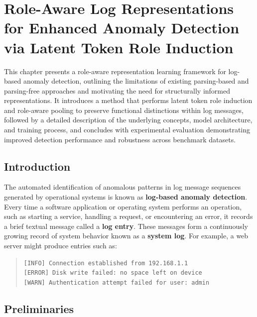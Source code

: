 \chapter{Role-Aware Log Representations for Enhanced Anomaly Detection via Latent Token Role Induction}

This chapter presents a role-aware representation learning framework for log-based anomaly detection, outlining the limitations of existing parsing-based and parsing-free approaches and motivating the need for structurally informed representations. It introduces a method that performs latent token role induction and role-aware pooling to preserve functional distinctions within log messages, followed by a detailed description of the underlying concepts, model architecture, and training process, and concludes with experimental evaluation demonstrating improved detection performance and robustness across benchmark datasets.

\section{Introduction}


The automated identification of anomalous patterns in log message sequences generated by operational systems is known as \textbf{log-based anomaly detection}. Every time a software application or operating system performs an operation, such as starting a service, handling a request, or encountering an error, it records a brief textual message called a \textbf{log entry}. These messages form a continuously growing record of system behavior known as a \textbf{system log}. For example, a web server might produce entries such as:

\begin{quote}
\texttt{[INFO] Connection established from 192.168.1.1} \\
\texttt{[ERROR] Disk write failed: no space left on device} \\
\texttt{[WARN] Authentication attempt failed for user: admin}
\end{quote}

\section{Preliminaries}
\label{sec:lad-prelim}

